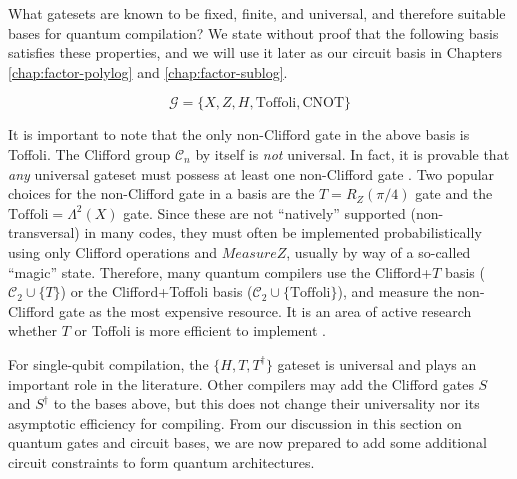 What gatesets are known to be fixed, finite, and universal, and therefore
suitable bases for quantum compilation? We state without proof that
the following basis satisfies these properties, and we will use it later as
our circuit basis in Chapters \ref{chap:factor-polylog} and
\ref{chap:factor-sublog}.

\begin{equation}
\mathcal{G} = \{X, Z, H, \text{Toffoli}, \text{CNOT}\}
\end{equation}

It is important to note that the only non-Clifford gate in the above basis
is Toffoli.
The Clifford group $\mathcal{C}_n$ by itself is \emph{not}
universal.
In fact, it is provable
that \emph{any} universal gateset must possess at least one
non-Clifford gate \cite{Zeng2011}.
Two popular choices for the non-Clifford gate in a basis are the $T = R_Z(\pi/4)$
gate and the $\text{Toffoli} = \Lambda^2(X)$ gate. Since these are not ``natively''
supported (non-transversal) in many codes, they must often be implemented
probabilistically using only Clifford operations and $MeasureZ$, usually
by way of a so-called ``magic'' state.
Therefore, many quantum compilers
use the Clifford+$T$ basis ($\mathcal{C}_2 \cup \{ T \}$)
or the Clifford+Toffoli basis ($\mathcal{C}_2 \cup \{ \text{Toffoli} \}$),
and measure
the non-Clifford gate as the most expensive resource. It is an area of
active research
whether $T$ or Toffoli is more efficient to implement
\cite{Jones2013a,Eastin2012}.

For single-qubit compilation, the $\{H,T, T^{\dagger}\}$ gateset is universal and
plays an important role in the literature. Other compilers may add
the Clifford gates $S$ and $S^{\dagger}$ to the bases above,
but this does not change their universality nor its asymptotic efficiency for
compiling. From our discussion in this section
on quantum gates and circuit bases, we are now prepared to add some additional
circuit constraints to form quantum architectures.
